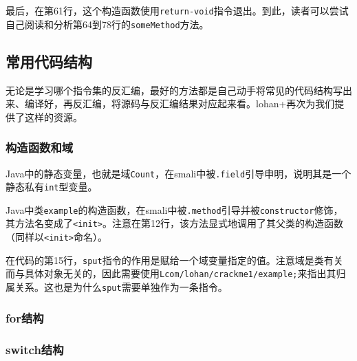 最后，在第61行，这个构造函数使用\lstinline!return-void!指令退出。到此，读者可以尝试自己阅读和分析第64到78行的\lstinline!someMethod!方法。

\subsection{常用代码结构}
无论是学习哪个指令集的反汇编，最好的方法都是自己动手将常见的代码结构写出来、编译好，再反汇编，将源码与反汇编结果对应起来看。lohan+再次为我们提供了这样的资源。

\subsubsection{构造函数和域}



Java中的静态变量，也就是域\lstinline!Count!，在smali中被\lstinline!.field!引导申明，说明其是一个静态私有\lstinline!int!型变量。

Java中类\lstinline!example!的构造函数，在smali中被\lstinline!.method!引导并被\lstinline!constructor!修饰，其方法名变成了\lstinline!<init>!。注意在第12行，该方法显式地调用了其父类的构造函数（同样以\lstinline!<init>!命名）。

在代码的第15行，\lstinline!sput!指令的作用是赋给一个域变量指定的值。注意域是类有关而与具体对象无关的，因此需要使用\lstinline!Lcom/lohan/crackme1/example;!来指出其归属关系。这也是为什么\lstinline!sput!需要单独作为一条指令。

\subsubsection{for结构}



\subsubsection{switch结构}



